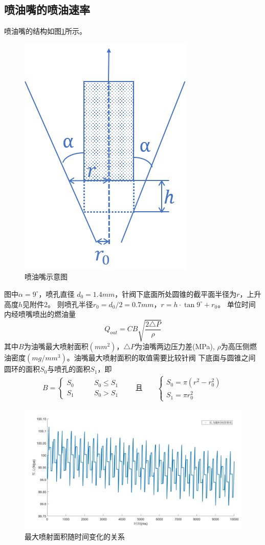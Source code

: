 \documentclass[withoutpreface,bwprint]{cumcmthesis} %
\begin{document}
\subsection{喷油嘴的喷油速率}
    喷油嘴的结构如图\ref{figure12}所示。
    \begin{figure}[htbp]
        \centering
        \includegraphics[width=.3\textwidth]{Pin.png}
        \caption{喷油嘴示意图}
        \label{figure12}
    \end{figure}
    图中$\alpha=9^\circ$，喷孔直径
    $d_0=1.4mm$，针阀下底面所处圆锥的截平面半径为$r$，上升高度$h$见附件2。
    则喷孔半径$r_0=d_0/2=0.7mm$，$r=h\cdot\tan 9^\circ + r_0$。
    单位时间内经喷嘴喷出的燃油量
    \begin{equation}
    Q_{out}=CB\sqrt{\frac{2 \triangle P}{\rho}}
    \label{equ49}
    \end{equation}
    其中$B$为油嘴最大喷射面积$(mm^2)$，$\triangle P$为油嘴两边压力差(MPa),
    $\rho$为高压侧燃油密度$(mg/mm^3)$。油嘴最大喷射面积的取值需要比较针阀
    下底面与圆锥之间圆环的面积$S_0$与喷孔的面积$S_1$，即
    \begin{eqnarray}
    B=
    \begin{cases}
        S_0 \quad \quad & S_0 \leq S_1 \\
        S_1    & S_0 > S_1
    \end{cases}
    \quad \quad
    \text{且}
    \quad \quad
    \begin{cases}
        S_0=\pi(r^2-r_0^2) \\
        S_1=\pi r_0^2
    \end{cases}
    \label{equ50}
    \end{eqnarray}
    \begin{figure}[h]
        \centering
        \includegraphics[width=.7\textwidth]{q210s.jpg}
        \caption{{\color{red}最大喷射面积随时间变化的关系}}
        \label{figure15}
    \end{figure}
\end{document}
